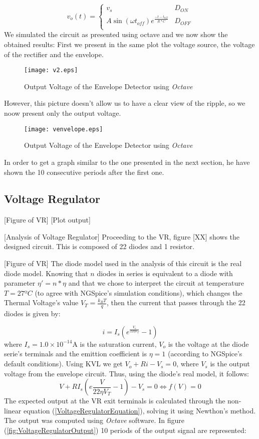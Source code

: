 \begin{equation}
	v_o(t) = \left\{
\begin{array}{ll}
	v_s & D_{ON} \\
	A  \sin(\omega t_{off})  e^{\frac{-t-t_{off}}{R*C}} & D_{OFF}\\
\end{array}
\right.
\end{equation}
We simulated the circuit as presented using octave and we now show the obtained results:
First we present in the same plot the voltage source, the voltage of the rectifier and the envelope.
\begin{figure}[H]
  \centering
  \texttt{[image: v2.eps]}
  \caption{Output Voltage of the Envelope Detector using \emph{Octave}}
  \label{fig:venvelope}
\end{figure}
However, this picture doesn't allow us to have a clear view of the ripple, so we noow present only the output voltage.
\begin{figure}[H]
  \centering
  \texttt{[image: venvelope.eps]}
  \caption{Output Voltage of the Envelope Detector using \emph{Octave}}
  \label{fig:venvelope}
\end{figure}
In order to get a graph similar to the one presented in the next section, he have shown the 10 consecutive periods after the first one.

\subsection{Voltage Regulator}
[Figure of VR]
[Plot output]

[Analysis of Voltage Regulator]
Proceeding to the VR, figure [XX] shows the designed circuit. This is composed of 22 diodes and 1 resistor.

[Figure of VR]
The diode model used in the analysis of this circuit is the real diode model. Knowing that $n$ diodes in series is equivalent to a diode with parameter $\eta'=n*\eta$ and that we chose to
interpret the circuit at temperature $T=27ºC$ (to agree with NGSpice's simulation conditions), which changes the Thermal Voltage's value $V_T=\frac{k_BT}{q}$, then the current that passes through the 22 diodes is given by:

\begin{equation}
i=I_s(e^{\frac{V_o}{22 \eta V_T}}-1)
\end{equation}
where $I_s=1.0\times 10^{-14}$A is the saturation current, $V_o$ is the voltage at the diode serie's terminals and the emittion coefficient is $\eta=1$ (according to NGSpice's default conditions).
Using KVL we get $V_o+Ri-V_s=0$, where $V_s$ is the output voltage from the envelope circuit. Thus, using the diode's real model, it follows:
\begin{equation}
  V+RI_s(e{\frac{V}{22 \eta V_T}}-1)-V_s=0 \Leftrightarrow f(V)=0
  \label{VoltageRegulatorEquation}
\end{equation}
The expected output at the VR exit terminals is calculated through the non-linear equation (\ref{VoltageRegulatorEquation}), solving it using Newthon's method.
The output was computed using \textit{Octave} software. In figure (\ref{fig:VoltageRegulatorOutput}) 10 periods of the output signal are represented:

